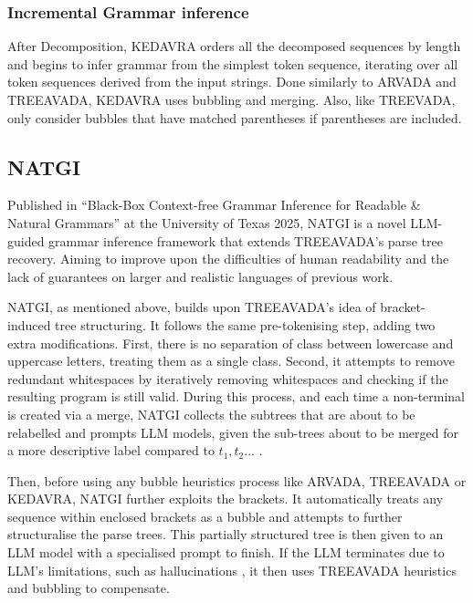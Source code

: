 \subsubsection{Incremental Grammar inference}

After Decomposition, KEDAVRA orders all the decomposed sequences by length and begins to infer grammar from the simplest token sequence, iterating over all token sequences derived from the input strings. Done similarly to ARVADA and TREEAVADA, KEDAVRA uses bubbling and merging. Also, like TREEVADA, only consider bubbles that have matched parentheses if parentheses are included. 

\subsection{NATGI}

Published in \enquote{Black-Box Context-free Grammar Inference for Readable \& Natural Grammars} at the University of Texas 2025\cite{arefinBlackboxContextfreeGrammar2025}, NATGI is a novel LLM-guided grammar inference framework that extends TREEAVADA's parse tree recovery. Aiming to improve upon the difficulties of human readability and the lack of guarantees on larger and realistic languages of previous work.

\vspace{\baselineskip}

NATGI, as mentioned above, builds upon TREEAVADA's idea of bracket-induced tree structuring. It follows the same pre-tokenising step, adding two extra modifications. First, there is no separation of class between lowercase and uppercase letters, treating them as a single class. Second, it attempts to remove redundant whitespaces by iteratively removing whitespaces and checking if the resulting program is still valid. During this process, and each time a non-terminal is created via a merge, NATGI collects the subtrees that are about to be relabelled and prompts LLM models, given the sub-trees about to be merged for a more descriptive label compared to $t_1, t_2 ...$ .

\vspace{\baselineskip}
Then, before using any bubble heuristics process like ARVADA, TREEAVADA or KEDAVRA, NATGI further exploits the brackets. It automatically treats any sequence within enclosed brackets as a bubble and attempts to further structuralise the parse trees. This partially structured tree is then given to an LLM model with a specialised prompt to finish. If the LLM terminates due to LLM's limitations, such as hallucinations \cite{orvalhoAreLargeLanguage2025a,arefinBlackboxContextfreeGrammar2025}, it then uses TREEAVADA heuristics and bubbling to compensate.

